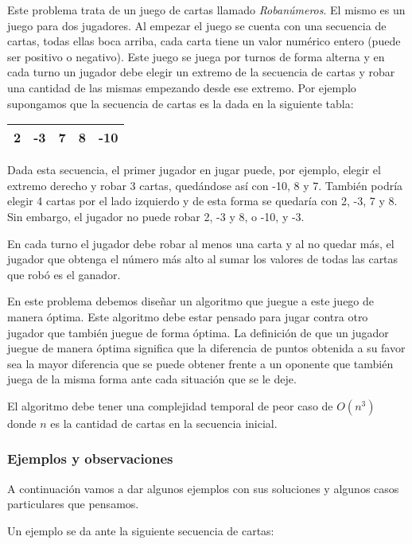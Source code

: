 Este problema trata de un juego de cartas llamado \emph{Robanúmeros}. El mismo es un juego para dos jugadores. Al empezar el juego se cuenta con una secuencia de cartas, todas ellas boca arriba, cada carta tiene un valor numérico entero (puede ser positivo o negativo). Este juego se juega por turnos de forma alterna y en cada turno un jugador debe elegir un extremo de la secuencia de cartas y robar una cantidad de las mismas empezando desde ese extremo. Por ejemplo supongamos que la secuencia de cartas es la dada en la siguiente tabla:
\begin{center}
\begin{tabular}{|c|c|c|c|c|}
\hline
2 & -3 & 7 & 8 & -10 \\
\hline
\end{tabular}
\end{center}

Dada esta secuencia, el primer jugador en jugar puede, por ejemplo, elegir el extremo derecho y robar 3 cartas, quedándose así con -10, 8 y 7. También podría elegir 4 cartas por el lado izquierdo y de esta forma se quedaría con 2, -3, 7 y 8. Sin embargo, el jugador no puede robar 2, -3 y 8, o -10, y -3.

En cada turno el jugador debe robar al menos una carta y al no quedar más, el jugador que obtenga el número más alto al sumar los valores de todas las cartas que robó es el ganador.

En este problema debemos diseñar un algoritmo que juegue a este juego de manera óptima. Este algoritmo debe estar pensado para jugar contra otro jugador que también juegue de forma óptima. La definición de que un jugador juegue de manera óptima significa que la diferencia de puntos obtenida a su favor sea la mayor diferencia que se puede obtener frente a un oponente que también juega de la misma forma ante cada situación que se le deje.

El algoritmo debe tener una complejidad temporal de peor caso de $O(n^3)$ donde $n$ es la cantidad de cartas en la secuencia inicial.

\subsubsection{Ejemplos y observaciones}

A continuación vamos a dar algunos ejemplos con sus soluciones y algunos casos particulares que pensamos.

Un ejemplo se da ante la siguiente secuencia de cartas:

